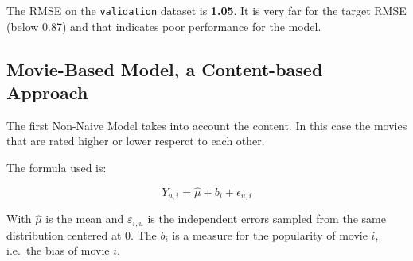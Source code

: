\documentclass[
]{article}
\newenvironment{Shaded}{}{}
\newcommand{\AttributeTok}[1]{\textcolor[rgb]{0.49,0.56,0.16}{#1}}
\newcommand{\CommentTok}[1]{\textcolor[rgb]{0.38,0.63,0.69}{\textit{#1}}}
\newcommand{\FunctionTok}[1]{\textcolor[rgb]{0.02,0.16,0.49}{#1}}
\newcommand{\NormalTok}[1]{#1}
\newcommand{\OtherTok}[1]{\textcolor[rgb]{0.00,0.44,0.13}{#1}}
\newcommand{\SpecialCharTok}[1]{\textcolor[rgb]{0.25,0.44,0.63}{#1}}
\newcommand{\StringTok}[1]{\textcolor[rgb]{0.25,0.44,0.63}{#1}}
\begin{document}
The RMSE on the \texttt{validation} dataset is \textbf{1.05}. It is very
far for the target RMSE (below 0.87) and that indicates poor performance
for the model.

\hypertarget{movie-based-model-a-content-based-approach}{%
\subsection{Movie-Based Model, a Content-based
Approach}\label{movie-based-model-a-content-based-approach}}

The first Non-Naive Model takes into account the content. In this case
the movies that are rated higher or lower resperct to each other.

The formula used is:

\[Y_{u,i} = \hat{\mu} + b_i + \epsilon_{u,i}\]

With \(\hat{\mu}\) is the mean and \(\varepsilon_{i,u}\) is the
independent errors sampled from the same distribution centered at 0. The
\(b_i\) is a measure for the popularity of movie \(i\), i.e.~the bias of
movie \(i\).

\begin{Shaded}
\end{Shaded}
\end{document}
